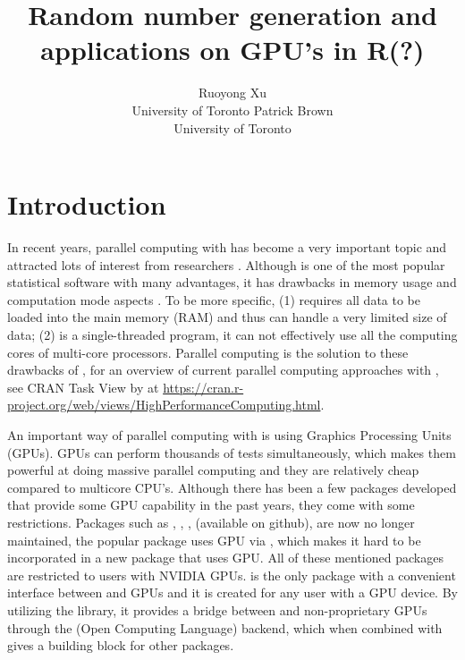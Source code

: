 \documentclass[article,nojss]{jss}\usepackage[]{graphicx}\usepackage[]{color}
\author{Ruoyong Xu\\University of Toronto
   \And Patrick Brown\\University of Toronto}
\title{Random number generation and applications on GPU’s in R(?)}
\begin{document}




\section[Introduction]{Introduction}

\begin{leftbar}
% 

In recent years, parallel computing with  \citep{r2021} has become a very important topic and attracted lots of interest from researchers \citep[see][for a review]{eddelbuettel2021parallel}. Although  is one of the most popular statistical software with many advantages, it has drawbacks in memory usage and computation mode aspects \citep{zhao_2016}. To be more specific, (1)  requires all data to be loaded into the main memory (RAM) and thus can handle a very limited size of data; (2)  is a single-threaded program, it can not effectively use all the computing cores of multi-core processors. Parallel computing is the solution to these drawbacks of , for an overview of current parallel computing approaches with , see CRAN Task View by \citet{cran2021} at \url{https://cran.r-project.org/web/views/HighPerformanceComputing.html}. 

An important way of parallel computing with  is using Graphics Processing Units (GPUs). GPUs can perform thousands of tests simultaneously, which makes them powerful at doing massive parallel computing and they are relatively cheap compared to multicore CPU's. Although there has been a few  packages developed that provide some GPU capability in the past years, they come with some restrictions. Packages such as , , ,  (available on github), are now no longer maintained, the popular  \citep{tensorflow1} package uses GPU via , which makes it hard to be incorporated in a new  package that uses GPU. All of these mentioned packages are restricted to  users with NVIDIA GPUs.  \citep{gpur1} is the only  package with a convenient interface between  and GPUs and it is created for any  user with a GPU device. By utilizing the  \citep*{rupp2016viennacl} library, it provides a bridge between  and non-proprietary GPUs through the  (Open Computing Language) backend, which when combined with  \citep{rcpp1} gives a building block for other  packages. 


\end{leftbar}
\end{document}
